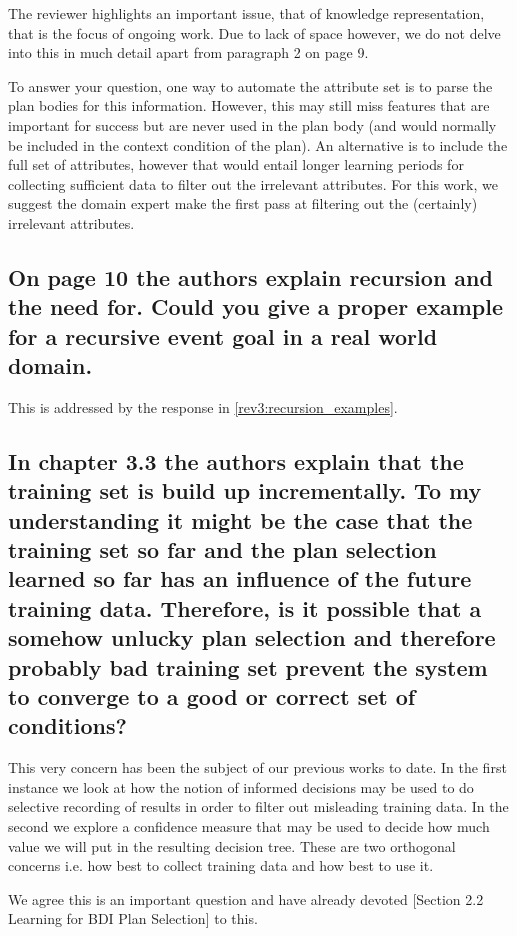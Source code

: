 \documentclass[preprint,12pt]{elsarticle}
\begin{document}
The reviewer highlights an important issue, that of knowledge representation, that is the focus of ongoing work. Due to lack of space however, we do not delve into this in much detail apart from paragraph 2 on page 9. 

To answer your question, one way to automate the attribute set is to parse the plan bodies for this information. However, this may still miss features that are important for success but are never used in the plan body (and would normally be included in the context condition of the plan). An alternative is to include the full set of attributes, however that would entail longer learning periods for collecting sufficient data to filter out the irrelevant attributes. For this work, we suggest the domain expert make the first pass at filtering out the (certainly) irrelevant attributes.

\subsection{On page 10 the authors explain recursion and the need for. Could you give a proper example for a recursive event goal in a real world domain.}

This is addressed by the response in \ref{rev3:recursion_examples}.

\subsection{In chapter 3.3 the authors explain that the training set is build up incrementally. To my understanding it might be the case that the training set so far and the plan selection learned so far has an influence of the future training data. Therefore, is it possible that a somehow unlucky plan selection and therefore probably bad training set prevent the system to converge to a good or correct set of conditions?}

This very concern has been the subject of our previous works \cite{Airiau:IJAT09,Singh:AAMAS10} to date. In the first instance \cite{Airiau:IJAT09} we look at how the notion of informed decisions may be used to do selective recording of results in order to filter out misleading training data. In the second \cite{Singh:AAMAS10} we explore a confidence measure that may be used to  decide how much value we will put in the resulting decision tree. These are two orthogonal concerns i.e. how best to collect training data and how best to use it.

We agree this is an important question and have already devoted [Section 2.2 Learning for BDI Plan Selection] to this.
\end{document}
